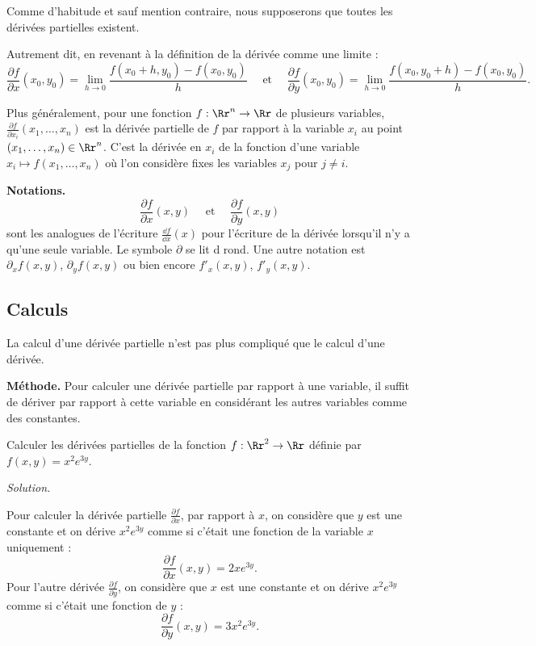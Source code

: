 Comme d'habitude et sauf mention contraire, nous supposerons que toutes les dérivées partielles existent.

Autrement dit, en revenant à la définition de la dérivée comme une limite :
$$\frac{\partial f}{\partial x} (x_0,y_0) = \lim_{h \rightarrow 0} 
\frac{f(x_0+h, y_0) - f(x_0,y_0)}{h}
\quad \text{ et } \quad 
\frac{\partial f}{\partial y} (x_0,y_0) = \lim_{h \rightarrow 0} 
\frac{f(x_0, y_0+h) - f(x_0,y_0)}{h}.$$




Plus généralement, pour une fonction $f : \Rr^n \to \Rr$ de plusieurs variables,
$\frac{\partial f}{\partial x_i} (x_1,\ldots,x_n)$ est la dérivée partielle de $f$ par rapport à la variable $x_i$ au point $(x_1,\ldots,x_n) \in \Rr^n$.
C'est la dérivée en $x_i$ de la fonction d'une variable $x_i \mapsto f(x_1,\ldots,x_n)$ où l'on considère fixes les variables $x_j$ pour $j \neq i$.

\bigskip

\textbf{Notations.}
$$\frac{\partial f}{\partial x} (x,y) \quad \text{ et } \quad \frac{\partial f}{\partial y} (x,y)$$
sont les analogues de l'écriture $\frac{\dd f}{\dd x}(x)$ pour l'écriture de la dérivée lorsqu'il n'y a qu'une seule variable.
Le symbole \og{}$\partial$\fg{} se lit \og{}d rond\fg{}.
Une autre notation est $\partial_x f(x,y)$, $\partial_y f(x,y)$ ou bien encore $f'_x (x,y)$, $f'_y (x,y)$.


\subsection{Calculs}

La calcul d'une dérivée partielle n'est pas plus compliqué que le calcul d'une dérivée.

\textbf{Méthode.}
Pour calculer une dérivée partielle par rapport à une variable, il suffit de dériver par rapport à cette variable en considérant les autres variables comme des constantes.


\begin{exemple}{}{}
	Calculer les dérivées partielles de la fonction 
	$f : \Rr^2 \to \Rr$ définie par $f(x,y)=x^2e^{3y}$.
	
	\medskip
	\emph{Solution.}
	
	Pour calculer la dérivée partielle $\frac{\partial f}{\partial x}$, par rapport à $x$, on considère que $y$ est une constante et on dérive $x^2e ^{3y}$ comme si c'était une fonction de la variable $x$ uniquement :
	$$\frac{\partial f}{\partial x}(x,y) =2xe ^{3y}.$$
	Pour l'autre dérivée  $\frac{\partial f}{\partial y}$, on considère que $x$ est une constante et on dérive $x^2e ^{3y}$ comme si c'était une fonction de $y$ :
	$$\frac{\partial f}{\partial y}(x,y) = 3x^2e ^{3y}.$$
\end{exemple}



